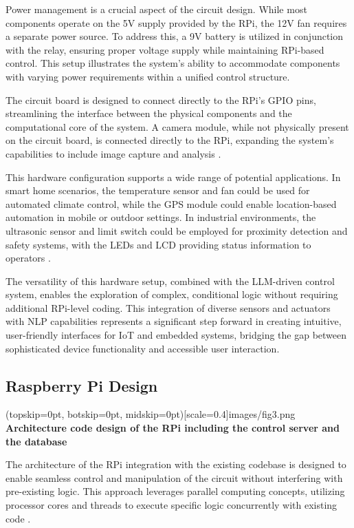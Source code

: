 \documentclass{ieeeaccess}
\begin{document}
Power management is a crucial aspect of the circuit design. While most components operate on the 5V supply provided by the RPi, the 12V fan requires a separate power source. To address this, a 9V battery is utilized in conjunction with the relay, ensuring proper voltage supply while maintaining RPi-based control. This setup illustrates the system's ability to accommodate components with varying power requirements within a unified control structure.

The circuit board is designed to connect directly to the RPi's GPIO pins, streamlining the interface between the physical components and the computational core of the system. A camera module, while not physically present on the circuit board, is connected directly to the RPi, expanding the system's capabilities to include image capture and analysis \cite{pi_camera_2018}.

This hardware configuration supports a wide range of potential applications. In smart home scenarios, the temperature sensor and fan could be used for automated climate control, while the GPS module could enable location-based automation in mobile or outdoor settings. In industrial environments, the ultrasonic sensor and limit switch could be employed for proximity detection and safety systems, with the LEDs and LCD providing status information to operators \cite{smith2020}.

The versatility of this hardware setup, combined with the LLM-driven control system, enables the exploration of complex, conditional logic without requiring additional RPi-level coding. This integration of diverse sensors and actuators with NLP capabilities represents a significant step forward in creating intuitive, user-friendly interfaces for IoT and embedded systems, bridging the gap between sophisticated device functionality and accessible user interaction.

\subsection{Raspberry Pi Design}

\Figure[t!](topskip=0pt, botskip=0pt,
midskip=0pt)[scale=0.4]{{images/fig3.png}}
{ \centering \textbf{Architecture code design of the RPi including the control server and the database}\label{fig3}}

The architecture of the RPi integration with the existing codebase is designed to enable seamless control and manipulation of the circuit without interfering with pre-existing logic. This approach leverages parallel computing concepts, utilizing processor cores and threads to execute specific logic concurrently with existing code \cite{wilkinson2005parallel}.
\end{document}

